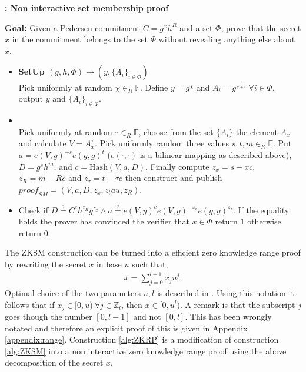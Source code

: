\begin{algorithm}[]
\caption{\textbf{: Non interactive set membership proof}}
\textbf{Goal:} Given a Pedersen commitment $C=g^x h^R$ and a set $\Phi$, prove that the secret $x$ in the commitment belongs to the set $\Phi$ without revealing anything else about $x$.
\vspace{2pt} \hline \vspace{2pt}
\begin{itemize}
  \item\textbf{SetUp $(g,h,\Phi)\xrightarrow[]{}(y,\{A_{i}\}_{i\in\Phi})$}\\
Pick uniformly at random $\chi\in_R\mathds{F}$. Define $y=g^\chi$ and $A_i=g^{\frac{1}{\chi+i}} \:\forall i\in\Phi$, output $y$ and $\{A_i\}_{i\in\Phi}$.

\item{}\\
Pick uniformly at random $\tau\in_R\mathds{F}$, choose from the set $\{A_i\}$ the element $A_x$ and calculate $V=A_x^\tau$. Pick uniformly random three values $s,t,m\in_R\mathds{F}$. Put $a=e(V,g)^{-s}e(g,g)^t$ ($e(\cdot,\cdot)$ is a bilinear mapping as described above), $D=g^sh^m$, and $c=\text{Hash}(V,a,D)$. Finally compute $z_x = s-x c$, $z_R = m-Rc$ and $z_\tau= t-\tau c$ then construct and publish $\textit{proof}_{SM} = (V,a,D,z_x,z_tau,z_R)$.

\item{}
Check if $D\overset{?}{=}C^ch^{z_R}g^{z_x}\wedge a \overset{?}{=} e(V,y)^c e(V,g)^{-z_x}e(g,g)^{z_\tau}$. If the equality holds the prover has convinced the verifier that $x\in\Phi$ return $1$ otherwise return $0$.
\end{itemize}
\label{alg:ZKSM}
\end{algorithm}

The ZKSM construction can be turned into a efficient zero knowledge range proof by rewriting the secret $x$ in base $u$ such that,
\begin{align*}
    x = \sum_{j=0}^{l-1} x_ju^j.
\end{align*}
Optimal choice of the two parameters $u,l$ is described in \cite{RANGE-SET}. 
Using this notation it follows that if $x_j\in[0,u)\: \forall j\in\mathds{Z}_l$, then $x\in[0,u^l)$. A remark is that the subscript $j$ goes though the number $[0,l-1]$ and not $[0,l]$. This has been wrongly notated \cite{RANGE-SET,ZKRP_Morais} and therefore an explicit proof of this is given in Appendix \ref{appendix:range}. Construction \ref{alg:ZKRP} is a modification of construction \ref{alg:ZKSM} into a non interactive zero knowledge range proof using the above decomposition of the secret $x$.

